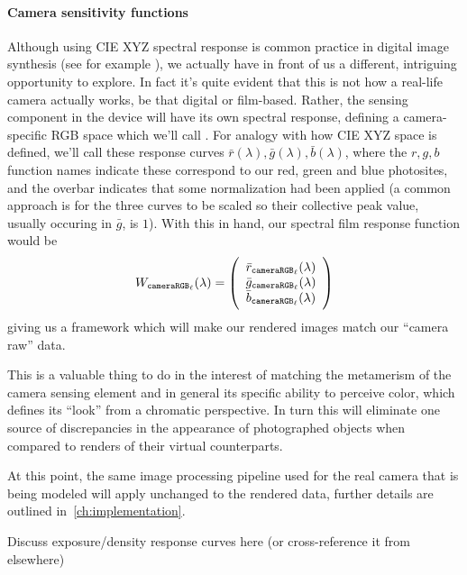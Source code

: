 \paragraph{Camera sensitivity functions}
Although using \gls{CIE} \gls{XYZ} spectral response is common practice
in digital image synthesis (see for example \cite{pharr2023, jakob2022mitsuba3,
ward1994}), we actually have in front of us a different, intriguing opportunity
to explore. 
In fact it's quite evident that this is not how a real-life camera actually works,
be that digital or film-based. 
Rather, the sensing component in the device will have its own spectral response,
defining a camera-specific \gls{RGB} space which we'll call \camRGBl.
For analogy with how \gls{CIE} \gls{XYZ} space is defined, we'll call these
response curves $\bar r(\lambda), \bar g(\lambda), \bar b(\lambda)$, where the 
$r,g,b$ function names indicate these correspond to our red, green and blue photosites, and
the overbar indicates that some normalization had been applied (a common approach is for the 
three curves to be scaled so their collective peak value, usually occuring in $\bar g$, is $1$).
With this in hand, our spectral film response function would be
\begin{equation}
	W_{\texttt{cameraRGB}_\ell}(\lambda) = 
	\left(
	\begin{array}{c}
		\bar r_{\texttt{cameraRGB}_\ell}(\lambda) \\
		\bar g_{\texttt{cameraRGB}_\ell}(\lambda) \\
		\bar b_{\texttt{cameraRGB}_\ell}(\lambda)
	\end{array}
	\right)
\end{equation}
giving us a framework which will make our rendered images match our ``camera raw'' 
data.

This is a valuable thing to do in the interest of matching the metamerism of the 
camera sensing element and in general its specific ability to perceive color, 
which defines its ``look'' from a chromatic perspective. 
In turn this will eliminate one source of discrepancies in the appearance of 
photographed objects when compared to renders of their virtual counterparts.

At this point, the same image processing pipeline used for the real camera
that is being modeled will apply unchanged to the rendered data, further 
details are outlined in~\cref{ch:implementation}.

\begin{inconstruction}
	Discuss exposure/density response curves here
	(or cross-reference it from elsewhere)
\end{inconstruction}


